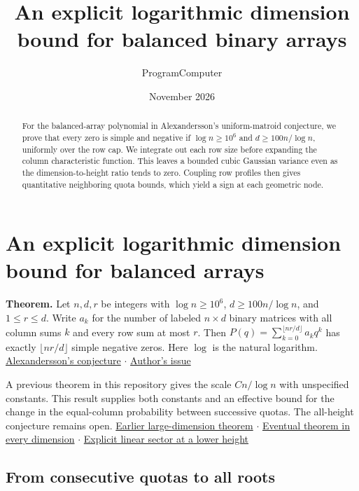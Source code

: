 \documentclass[11pt]{article}
\title{An explicit logarithmic dimension bound for balanced binary arrays}
\author{ProgramComputer}
\date{November 2026}
\begin{document}
\maketitle
\begin{abstract}
For the balanced-array polynomial in Alexandersson's uniform-matroid conjecture,
we prove that every zero is simple and negative if $\log n\ge 10^6$ and $d\ge 100n/\log n$,
uniformly over the row cap. We integrate out each row size before expanding
the column characteristic function. This leaves a bounded cubic Gaussian variance
even as the dimension-to-height ratio tends to zero. Coupling row profiles then
gives quantitative neighboring quota bounds, which yield a sign at each geometric node.
\end{abstract}
\section{An explicit logarithmic dimension bound for balanced arrays}

\textbf{Theorem.} Let $n,d,r$ be integers with $\log n\ge10^6$, $d\ge100n/\log n$, and $1\le r\le d$. Write $a_k$ for the number of labeled $n\times d$ binary matrices with all column sums $k$ and every row sum at most $r$. Then $P(q)=\sum_{k=0}^{\lfloor nr/d\rfloor} a_k q^k$ has exactly $\lfloor nr/d\rfloor$ simple negative zeros. Here $\log$ is the natural logarithm. \href{https://www.symmetricfunctions.com/realRootedOpenProblems.htm\#conjBalancedArrays}{Alexandersson's conjecture}  $\cdot$  \href{https://github.com/PerAlexandersson/RealRooted/issues/2005}{Author's issue}

A previous theorem in this repository gives the scale $Cn/\log n$ with unspecified constants. This result supplies both constants and an effective bound for the change in the equal-column probability between successive quotas. The all-height conjecture remains open. \href{https://github.com/ProgramComputer/open-math-research/blob/main/topics/balanced-arrays/dense-regime/README.md}{Earlier large-dimension theorem}  $\cdot$  \href{https://github.com/ProgramComputer/open-math-research/blob/main/topics/balanced-arrays/eventual-all/README.md}{Eventual theorem in every dimension}  $\cdot$  \href{https://github.com/ProgramComputer/open-math-research/blob/main/topics/balanced-arrays/adjacent-quotas/README.md}{Explicit linear sector at a lower height}


\subsection{From consecutive quotas to all roots}
\end{document}
